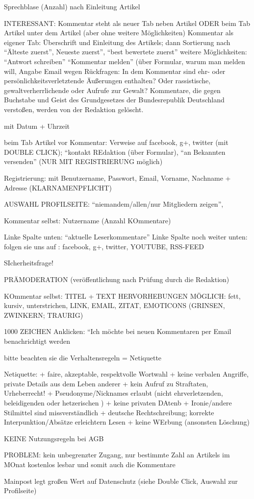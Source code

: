 Sprechblase (Anzahl) nach Einleitung Artikel

INTERESSANT: Kommentar steht als neuer Tab neben Artikel ODER beim Tab Artikel unter dem Artikel (aber ohne weitere Möglichkeiten)
Kommentar als eigener Tab: Überschrift und Einleitung des Artikels; dann Sortierung nach ``Älteste zuerst'', Neueste zuerst'', ``best bewertete zuerst''
weitere Möglichkeiten: ``Antwort schreiben'' ``Kommentar melden'' (über Formular, warum man melden will, Angabe Email wegen Rückfragen: In dem Kommentar sind ehr- oder persönlichkeitsverletztende Äußerungen enthalten? Oder rassistische, gewaltverherrlichende oder Aufrufe zur Gewalt? Kommentare, die gegen Buchstabe und Geist des Grundgesetzes der Bundesrepublik Deutschland verstoßen, werden von der Redaktion gelöscht.

mit Datum + Uhrzeit

beim Tab Artikel vor Kommentar: Verweise auf facebook, g+, twitter (mit DOUBLE CLICK); ``kontakt REdaktion (über Formular), ``an Bekannten versenden'' (NUR MIT REGISTRIERUNG möglich)

Registrierung:
mit Benutzername, Passwort, Email, Vorname, Nachname + Adresse (KLARNAMENPFLICHT)

AUSWAHL PROFILSEITE: ``niemandem/allen/nur Mitgliedern zeigen'', 

Kommentar selbst: Nutzername (Anzahl KOmmentare)

Linke Spalte unten: ``aktuelle Leserkommentare''
Linke Spalte noch weiter unten: folgen sie uns auf : facebook, g+, twitter, YOUTUBE, RSS-FEED

SIcherheitsfrage!

PRÄMODERATION (veröffentlichung nach Prüfung durch die Redaktion)

KOmmentar selbst: TITEL + TEXT
HERVORHEBUNGEN MÖGLICH: fett, kursiv, unterstrichen, LINK, EMAIL, ZITAT, EMOTICONS (GRINSEN, ZWINKERN; TRAURIG)

1000 ZEICHEN
Anklicken: ``Ich möchte bei neuen Kommentaren per Email benachrichtigt werden

bitte beachten sie die Verhaltensregeln = Netiquette

Netiquette:
+ faire, akzeptable, respektvolle Wortwahl
+ keine verbalen Angriffe, private Details aus dem Leben anderer
+ kein Aufruf zu Straftaten, Urheberrecht!
+ Pseudonyme/Nicknames erlaubt (nicht ehrverletzenden, beleidigenden oder hetzerischen )
+ keine privaten DAtenb
+ Ironie/andere Stilmittel sind missverständlich
+ deutsche Rechtschreibung; korrekte Interpunktion/Absätze erleichtern Lesen
+ keine WErbung (ansonsten Löschung)

KEINE Nutzungsregeln bei AGB

PROBLEM: kein unbegrenzter Zugang, nur bestimmte Zahl an Artikels im MOnat kostenlos lesbar und somit auch die Kommentare































Mainpost legt großen Wert auf Datenschutz (siehe Double Click, Auswahl zur Profilseite)